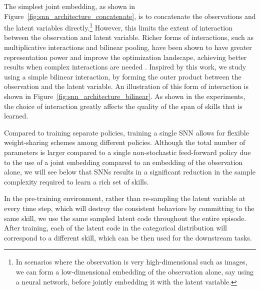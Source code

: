 \documentclass{article} %
\begin{document}
The simplest joint embedding, as shown in Figure~\ref{fig:snn_architecture_concatenate}, is to concatenate the observations and the latent variables directly.\footnote{In scenarios where the observation is very high-dimensional such as images, we can form a low-dimensional embedding of the observation alone, say using a neural network, before jointly embedding it with the latent variable.} However, this limits the extent of interaction between the observation and latent variable. Richer forms of interactions, such as multiplicative interactions and bilinear pooling, have been shown to have greater representation power and improve the optimization landscape, achieving better results when complex interactions are needed \citep{fukui2016multimodal, wu2016multiplicative}. Inspired by this work, we study using a simple bilinear interaction, by forming the outer product between the observation and the latent variable. An illustration of this form of interaction is shown in Figure~\ref{fig:snn_architecture_bilinear}. As shown in the experiments, the choice of interaction greatly affects the quality of the span of skills that is learned. %


Compared to training separate policies, training a single SNN allows for flexible weight-sharing schemes among different policies. Although the total number of parameters is larger compared to a single non-stochastic feed-forward policy due to the use of a joint embedding compared to an embedding of the observation alone, we will see below that SNNs results in a significant reduction in the sample complexity required to learn a rich set of skills.

In the pre-training environment, rather than re-sampling the latent variable at every time step, which will destroy the consistent behaviors by committing to the same skill, we use the same sampled latent code throughout the entire episode. After training, each of the latent code in the categorical distribution will correspond to a different skill, which can be then used for the downstream tasks.%

\end{document}
